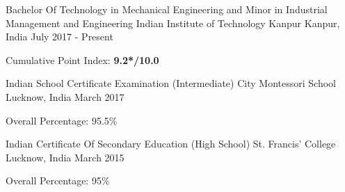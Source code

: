 
\begin{cventries}

  \cventry
    {Bachelor Of Technology in Mechanical Engineering and Minor in Industrial Management and Engineering}
    {Indian Institute of Technology Kanpur}
    {Kanpur, India}
    {July 2017 - Present}
    {
      \begin{cvitems}
        \item {Cumulative Point Index: \textbf{9.2*/10.0}}
      \end{cvitems}
    }
  
  \cventry
    {Indian School Certificate Examination (Intermediate)}
    {City Montessori School}
    {Lucknow, India}
    {March 2017}
    {
      \begin{cvitems}
        \item {Overall Percentage: 95.5\%}
      \end{cvitems}
    }

  \cventry
    {Indian Certificate Of Secondary Education (High School)}
    {St. Francis' College}
    {Lucknow, India}
    {March 2015}
    {
      \begin{cvitems}
        \item {Overall Percentage: 95\%}
      \end{cvitems}
    }
    
\end{cventries}

